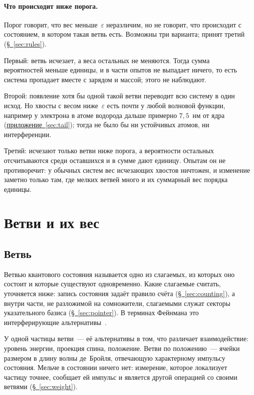 \documentclass[11pt,a4paper]{article}
\begin{document}
\paragraph{Что происходит ниже порога.}
Порог говорит, что вес меньше~$\varepsilon$ неразличим, но не говорит, что происходит с состоянием, в котором такая ветвь есть. Возможны три варианта; принят третий (\hyperref[sec:rules]{\S~\ref*{sec:rules}}).

Первый: ветвь исчезает, а веса остальных не меняются. Тогда сумма вероятностей меньше единицы, и в части опытов не выпадает ничего, то есть система пропадает вместе с зарядом и массой; этого не наблюдают.

Второй: появление хотя бы одной такой ветви переводит всю систему в один исход. Но хвосты с весом ниже~$\varepsilon$ есть почти у любой волновой функции, например у электрона в атоме водорода дальше примерно $7{,}5$~нм от ядра (\hyperref[sec:tail]{приложение~\ref*{sec:tail}}); тогда не было бы ни устойчивых атомов, ни интерференции.

Третий: исчезают только ветви ниже порога, а вероятности остальных отсчитываются среди оставшихся и в сумме дают единицу. Опытам он не противоречит: у обычных систем вес исчезающих хвостов ничтожен, и изменение заметно только там, где мелких ветвей много и их суммарный вес порядка единицы.

\section{Ветви и их вес}
\label{sec:systems}

\subsection{Ветвь}
\label{sec:branch}

Ветвью квантового состояния называется одно из слагаемых, из которых оно состоит и которые существуют одновременно. Какие слагаемые считать, уточняется ниже: запись состояния задаёт правило счёта (\hyperref[sec:counting]{\S~\ref*{sec:counting}}), а внутри части, не разложимой на сомножители, слагаемыми служат секторы указательного базиса (\hyperref[sec:pointer]{\S~\ref*{sec:pointer}}). В терминах Фейнмана это интерферирующие альтернативы~\cite{feynmanhibbs1965}.

У одной частицы ветви~--- её альтернативы в том, что различает взаимодействие: уровень энергии, проекция спина, положение. Ветви по положению~--- ячейки размером в длину волны де~Бройля, отвечающую характерному импульсу состояния. Мельче в состоянии ничего нет: измерение, которое локализует частицу точнее, сообщает ей импульс и является другой операцией со своими ветвями (\hyperref[sec:weight]{\S~\ref*{sec:weight}}).
\end{document}
